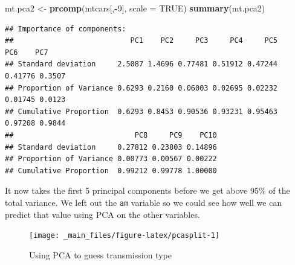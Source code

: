 \documentclass[
]{book}
\newenvironment{Shaded}{\begin{snugshade}}{\end{snugshade}}
\newcommand{\AttributeTok}[1]{\textcolor[rgb]{0.13,0.29,0.53}{#1}}
\newcommand{\ConstantTok}[1]{\textcolor[rgb]{0.56,0.35,0.01}{#1}}
\newcommand{\DecValTok}[1]{\textcolor[rgb]{0.00,0.00,0.81}{#1}}
\newcommand{\FunctionTok}[1]{\textcolor[rgb]{0.13,0.29,0.53}{\textbf{#1}}}
\newcommand{\NormalTok}[1]{#1}
\newcommand{\OtherTok}[1]{\textcolor[rgb]{0.56,0.35,0.01}{#1}}
\newcommand{\SpecialCharTok}[1]{\textcolor[rgb]{0.81,0.36,0.00}{\textbf{#1}}}
\newcommand{\StringTok}[1]{\textcolor[rgb]{0.31,0.60,0.02}{#1}}
\theoremstyle{definition}
\theoremstyle{definition}
\theoremstyle{definition}
\theoremstyle{definition}
\theoremstyle{remark}
\begin{document}
\begin{Shaded}
\begin{Highlighting}[]
\NormalTok{mt.pca2 }\OtherTok{\textless{}{-}} \FunctionTok{prcomp}\NormalTok{(mtcars[,}\SpecialCharTok{{-}}\DecValTok{9}\NormalTok{], }\AttributeTok{scale =} \ConstantTok{TRUE}\NormalTok{)}
\FunctionTok{summary}\NormalTok{(mt.pca2)}
\end{Highlighting}
\end{Shaded}

\begin{verbatim}
## Importance of components:
##                           PC1    PC2     PC3     PC4     PC5     PC6    PC7
## Standard deviation     2.5087 1.4696 0.77481 0.51912 0.47244 0.41776 0.3507
## Proportion of Variance 0.6293 0.2160 0.06003 0.02695 0.02232 0.01745 0.0123
## Cumulative Proportion  0.6293 0.8453 0.90536 0.93231 0.95463 0.97208 0.9844
##                            PC8     PC9    PC10
## Standard deviation     0.27812 0.23803 0.14896
## Proportion of Variance 0.00773 0.00567 0.00222
## Cumulative Proportion  0.99212 0.99778 1.00000
\end{verbatim}

It now takes the first 5 principal components before we get above 95\% of the total variance. We left out the \texttt{am} variable so we could see how well we can predict that value using PCA on the other variables.

\begin{Shaded}
\end{Shaded}

\begin{figure}

{\centering \texttt{[image: \_main\_files/figure-latex/pcasplit-1]} 

}

\caption{Using PCA to guess transmission type}\label{fig:pcasplit}
\end{figure}
\end{document}
